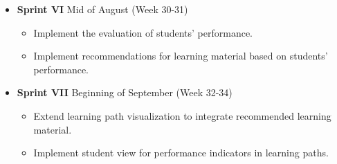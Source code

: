 \documentclass[a4paper,12pt,twoside]{article}
\begin{document}
\begin{itemize}
        \item \textbf{Sprint VI} Mid of August (Week 30-31)
              \begin{itemize}
                      \item Implement the evaluation of students' performance.
                      \item Implement recommendations for learning material based on students' performance.
              \end{itemize}

        \item \textbf{Sprint VII} Beginning of September (Week 32-34)
              \begin{itemize}
                      \item Extend learning path visualization to integrate recommended learning material.
                      \item Implement student view for performance indicators in learning paths.
              \end{itemize}
\end{itemize}

\clearpage

\clearpage


\end{document}
